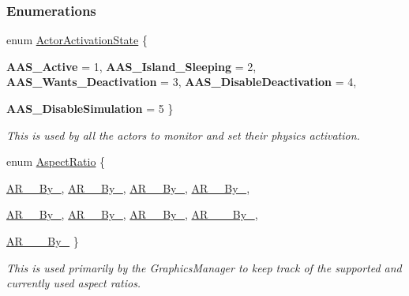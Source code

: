 \subsubsection*{Enumerations}
\begin{DoxyCompactItemize}
\item 
enum \hyperlink{namespaceMezzanine_a752d573f0ccb7dac166a15a756dd0dbb}{ActorActivationState} \{ \par
{\bfseries AAS\_\-Active} =  1, 
{\bfseries AAS\_\-Island\_\-Sleeping} =  2, 
{\bfseries AAS\_\-Wants\_\-Deactivation} =  3, 
{\bfseries AAS\_\-DisableDeactivation} =  4, 
\par
{\bfseries AAS\_\-DisableSimulation} =  5
 \}
\begin{DoxyCompactList}\small\item\em This is used by all the actors to monitor and set their physics activation. \item\end{DoxyCompactList}\item 
enum \hyperlink{namespaceMezzanine_a4f14cccd98d1bdc1bf934c1c028e3eaf}{AspectRatio} \{ \par
\hyperlink{namespaceMezzanine_a4f14cccd98d1bdc1bf934c1c028e3eafa4f3ca4673d11774b77de4b1c51be122b}{AR\_\_\-By\_}, 
\hyperlink{namespaceMezzanine_a4f14cccd98d1bdc1bf934c1c028e3eafaa7ca7a1749373d75bec977396ea8af3c}{AR\_\_\-By\_}, 
\hyperlink{namespaceMezzanine_a4f14cccd98d1bdc1bf934c1c028e3eafaac26ee01f52f68b3a67beccc4ee4f950}{AR\_\_\-By\_}, 
\hyperlink{namespaceMezzanine_a4f14cccd98d1bdc1bf934c1c028e3eafae7297c6f8720aa5453ea9cbc270ec149}{AR\_\_\-By\_}, 
\par
\hyperlink{namespaceMezzanine_a4f14cccd98d1bdc1bf934c1c028e3eafaad0586105b44a5d1b093a8d072d3e297}{AR\_\_\-By\_}, 
\hyperlink{namespaceMezzanine_a4f14cccd98d1bdc1bf934c1c028e3eafabd1801766c3dd81470e785a604fb8db2}{AR\_\_\-By\_}, 
\hyperlink{namespaceMezzanine_a4f14cccd98d1bdc1bf934c1c028e3eafa037068693e5a954da062e4f6122d1ad7}{AR\_\_\-By\_}, 
\hyperlink{namespaceMezzanine_a4f14cccd98d1bdc1bf934c1c028e3eafa14073edea666339eb6fdaa3ca23e946d}{AR\_\_\_\-By\_}, 
\par
\hyperlink{namespaceMezzanine_a4f14cccd98d1bdc1bf934c1c028e3eafaa95e86e3db402a75a3de756247da4b29}{AR\_\_\_\-By\_}
 \}
\begin{DoxyCompactList}\small\item\em This is used primarily by the GraphicsManager to keep track of the supported and currently used aspect ratios. \item\end{DoxyCompactList}\item 

\end{DoxyCompactItemize}
